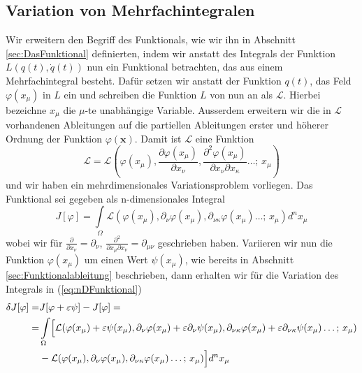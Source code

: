 \subsection{Variation von Mehrfachintegralen}
Wir erweitern den Begriff des Funktionals, wie wir ihn in Abschnitt
\ref{sec:DasFunktional} definierten, indem wir anstatt des Integrals der
Funktion $L(q(t),\dot q(t))$ nun ein Funktional betrachten, das aus einem
Mehrfachintegral besteht. Dafür setzen wir anstatt der Funktion $q(t)$, das
Feld $\varphi(x_{\mu})$ in $L$ ein und schreiben die Funktion $L$ von nun an
als $\mathcal{L}$. Hierbei bezeichne $x_{\mu}$ die $\mu$-te unabhängige
Variable. Ausserdem erweitern wir die in $\mathcal{L}$ vorhandenen Ableitungen
auf die partiellen Ableitungen erster und höherer Ordnung der Funktion
$\varphi(\mathbf{x})$. Damit ist $\mathcal{L}$ eine Funktion 
\begin{equation}\label{eq:LagrangeDensity}
  \mathcal{L}=\mathcal{L}\left(\varphi(x_\mu),\frac{\partial\varphi(x_\mu)}{\partial x_{\nu}},
  \frac{\partial^2\varphi(x_\mu)}{\partial x_{\nu}\partial x_{\kappa}}\dots ;\, x_\mu\right)
\end{equation}
und wir haben ein mehrdimensionales Variationsproblem vorliegen. Das Funktional
sei gegeben als n-dimensionales Integral
\begin{equation}\label{eq:nDFunktional}
  J[\varphi]=\int\limits_{\Omega}\mathcal{L}\left(
    \varphi(x_\mu),\partial_{\nu}\varphi(x_\mu),
    \partial_{\nu\kappa}\varphi(x_\mu)\dots ;\, x_\mu\right)d^nx_\mu
\end{equation}
wobei wir für $\frac{\partial}{\partial x_{\nu}}=\partial_{\nu}$,
$\frac{\partial^2}{\partial x_{\mu}\partial x_{\nu}} =\partial_{\mu\nu}$
geschrieben haben. Variieren wir nun die Funktion $\varphi(x_\mu)$ um einen
Wert $\psi(x_\mu)$, wie bereits in Abschnitt \ref{sec:Funktionalableitung}
beschrieben, dann erhalten wir für die Variation des Integrals in
(\ref{eq:nDFunktional})
\begin{align} \label{eq:VariationFeld}
  \delta J[\varphi]=& J[\varphi+\varepsilon\psi]-J[\varphi]=\\
  =&\int\limits_{\Omega}\Bigl[\mathcal{L}(
    \varphi(x_\mu)+\varepsilon\psi(x_\mu),
      \partial_{\nu}\varphi(x_\mu)+\varepsilon\partial_{\nu}\psi(x_\mu),
      \partial_{\nu\kappa}\varphi(x_\mu)+\varepsilon\partial_{\nu\kappa}\psi(x_\mu)\dots ;\, x_\mu)\nonumber\\
      &-\mathcal{L}( \varphi(x_\mu),\partial_{\nu}\varphi(x_\mu),
     \partial_{\nu\kappa}\varphi(x_\mu)\dots ;\, x_\mu)\Bigr]d^n x_\mu \nonumber
\end{align}

